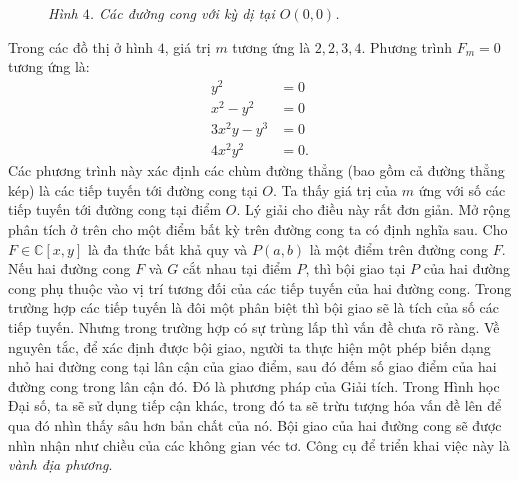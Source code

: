 \begin{multicols}{2}
\begin{figure}[H]
		\caption{\small$F=x^3+x^2-y^2$ \quad$F=(x^2 + y^2)^3- 4x^2y^2$}
		\caption{\small\textit{\color{duongvaotoanhoc}Hình $4$. Các đường cong với kỳ dị tại $O(0,0)$.}}
		\vspace*{-5pt}
	\end{figure}
	Trong các đồ thị ở hình $4$, giá trị $m$ tương ứng là $2,2,3,4$. Phương trình
	$F_m=0$
	tương ứng là:
	\begin{align*}
		y^2&=0\\
		x^2-y^2&=0\\
		3x^2y-y^3&=0\\
		4x^2y^2&=0.
	\end{align*} 
	Các phương trình này xác định các chùm đường thẳng (bao gồm cả đường thẳng kép) là các tiếp tuyến tới đường cong tại $O$. 
	\vskip 0.1cm
	Ta thấy giá trị của $m$ ứng với số các tiếp tuyến tới đường cong tại điểm $O$. Lý giải cho điều này rất đơn giản. 
	\vskip 0.2cm
	\vskip 0.2cm
	Mở rộng phân tích ở trên cho một điểm bất kỳ trên đường cong ta có định nghĩa sau. 
	Cho $F\in \mathbb C[x,y]$ là đa thức bất khả quy và $P(a,b)$ là một điểm trên đường cong $F$. 
	\vskip 0.2cm
	\vskip 0.2cm
	Nếu hai đường cong $F$  và $G$  cắt nhau tại điểm $P$, thì bội giao tại $P$ của hai đường cong phụ thuộc vào vị trí tương đối của các tiếp tuyến của hai đường cong. Trong trường hợp các tiếp tuyến là đôi một phân biệt thì bội giao sẽ là tích của số các tiếp tuyến. Nhưng trong trường hợp có sự trùng lấp thì vấn đề chưa rõ ràng. 
	\vskip 0.1cm
	Về nguyên tắc, để xác định được bội giao, người ta thực hiện một phép biến dạng nhỏ hai đường cong tại lân cận của giao điểm, sau đó đếm số giao điểm của hai đường cong trong lân cận đó. Đó là phương pháp của Giải tích. Trong Hình học Đại số, ta sẽ sử dụng tiếp cận khác, trong đó ta sẽ trừu tượng hóa vấn đề lên để qua đó nhìn thấy sâu hơn bản chất của nó. Bội giao của hai đường cong sẽ được nhìn nhận như chiều của các không gian véc tơ. Công cụ để triển khai việc này là {\em vành địa phương}. 

\end{multicols}

